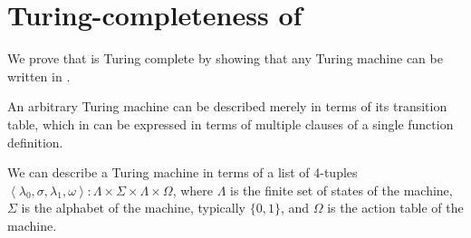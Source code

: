 \section{Turing-completeness of \D{}}

We prove that \D{} is Turing complete by showing that any Turing machine can be
written in \D{}.

An arbitrary Turing machine can be described merely in terms of its transition
table, which in \D{} can be expressed in terms of multiple clauses of a single
function definition.

We can describe a Turing machine in terms of a list of 4-tuples $\left\langle
\lambda_0, \sigma, \lambda_1, \omega \right\rangle : \Lambda \times \Sigma
\times \Lambda \times \Omega$, where $\Lambda$ is the finite set of states of
the machine, $\Sigma$ is the alphabet of the machine, typically $\{0,1\}$, and
$\Omega$ is the action table of the machine.
